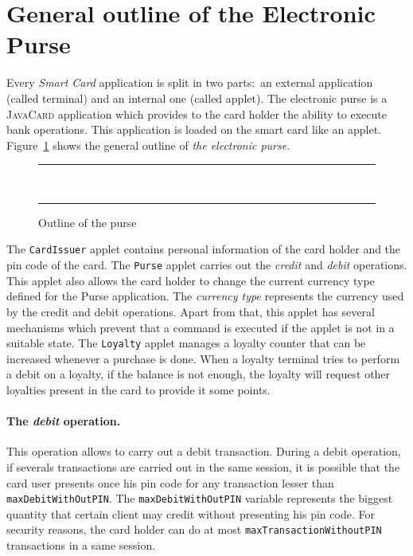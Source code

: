 \documentclass[a4paper]{llncs}
\begin{document}
\section{General outline of the Electronic Purse}
\label{SectGenPurse}
Every \textit{Smart Card} application is split in two
parts$:$ an external application (called terminal) and an
internal one (called applet). The electronic purse is a
\textsc{JavaCard} application which provides to the card holder
the ability to execute bank operations. This application is loaded on
the smart card like an applet. Figure~\ref{fig-cas-pur} shows the
general outline of \textit{the electronic purse}.




\begin{center}
\begin{figure}[hbt]
\rule{\linewidth}{0.3mm}
\\[2.5ex]
\centering
{}
\caption{Outline of the purse}
\label{fig-cas-pur}
\rule{\linewidth}{0.3mm}
\end{figure}
\end{center}




The  \texttt{CardIssuer} applet contains personal information of the card
holder and the pin code of the card. The \texttt{Purse}
applet carries out the \textit{credit} and \textit{debit}
operations. This applet also allows the card holder to change the
current currency type defined for the Purse application. The
\textit{currency type} represents the
currency used by the credit and debit operations. Apart from that,
this applet has several mechanisms
which prevent that a command is executed if the applet is not in a
suitable state. The \texttt{Loyalty} applet manages a loyalty counter
that can be increased whenever a purchase is done. When a loyalty
terminal tries to perform a debit on a loyalty, if the balance is not
enough, the loyalty will request other loyalties present in the card
to provide it some points.


\paragraph{\bf The \textit{debit} operation.}
This operation allows to carry out a debit transaction. During a debit 
operation, if severals transactions are carried out in the same
session, it is possible that
the card user presents once his pin code for any transaction lesser than
\texttt{maxDebitWithOutPIN}. The \texttt{maxDebitWithOutPIN} variable
represents the biggest quantity that certain client may credit without
presenting his pin code. For
security reasons, the card holder can do at most
\texttt{maxTransactionWithoutPIN} transactions in a same session. 
\end{document}
